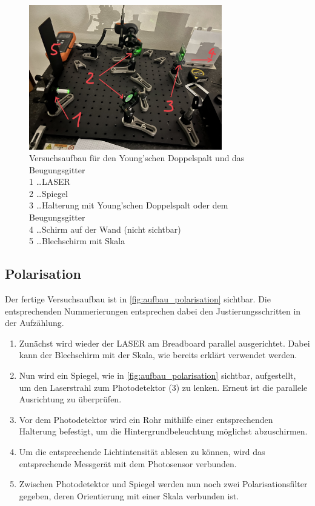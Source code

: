 \documentclass[12pt,english,ngerman]{scrartcl}
\begin{document}
\begin{figure}[H]
	\begin{center}
		\includegraphics[width =0.75\textwidth]{./figures/aufbau_doppelspalt.jpg}
	\end{center}
	\caption[Versuchsaufbau für den Young'schen Doppelspalt und das Beugungsgitter] {
		Versuchsaufbau für den Young'schen Doppelspalt und das Beugungsgitter \\
		1 \dots LASER                                                         \\
		2 \dots Spiegel                                                       \\
		3 \dots Halterung mit Young'schen Doppelspalt oder dem Beugungsgitter \\
		4 \dots Schirm auf der Wand (nicht sichtbar)                          \\
		5 \dots Blechschirm mit Skala
	}\label{fig:aufbau_doppelspalt}
\end{figure}

\subsection{Polarisation}

Der fertige Versuchsaufbau ist in \autoref{fig:aufbau_polarisation} sichtbar.
Die entsprechenden Nummerierungen entsprechen dabei den Justierungsschritten in
der Aufzählung.

\begin{enumerate}
	\item Zunächst wird wieder der LASER am Breadboard parallel ausgerichtet. Dabei kann
	      der Blechschirm mit der Skala, wie bereits erklärt verwendet werden.
	\item Nun wird ein Spiegel, wie in \autoref{fig:aufbau_polarisation} sichtbar,
	      aufgestellt, um den Laserstrahl zum Photodetektor (3) zu lenken. Erneut ist die
	      parallele Ausrichtung zu überprüfen.
	\item Vor dem Photodetektor wird ein Rohr mithilfe einer entsprechenden Halterung
	      befestigt, um die Hintergrundbeleuchtung möglichst abzuschirmen.
	\item Um die entsprechende Lichtintensität ablesen zu können, wird das entsprechende
	      Messgerät mit dem Photosensor verbunden.
	\item Zwischen Photodetektor und Spiegel werden nun noch zwei Polarisationsfilter
	      gegeben, deren Orientierung mit einer Skala verbunden ist.
\end{enumerate}
\end{document}
